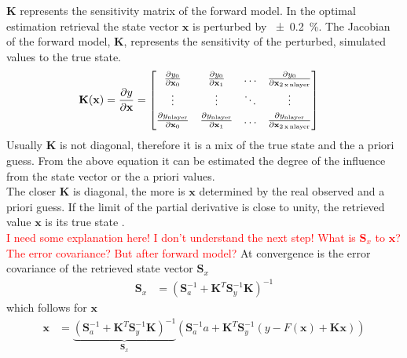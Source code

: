 $\mathbf{K}$ represents the sensitivity matrix of the forward model. In the optimal estimation retrieval the state vector $\mathbf{x}$ is perturbed by \SI{\pm 0.2}{\percent}. The Jacobian of the forward model, $\mathbf{K}$, represents the sensitivity of the perturbed, simulated values to the true state. 
\begin{align}
	\mathbf{K}(\mathbf{x}) & = \frac{\partial y}{\partial \mathbf{x}} =
    	\begin{bmatrix}
    		\frac{\partial y_0}{\partial \mathbf{x}_0} & 
            \frac{\partial y_0}{\partial \mathbf{x}_1}  & 
            \ldots & 
            \frac{\partial y_0}{\partial \mathbf{x}_{2\,\text{x\,nlayer}}} \\[0.3em]
            \vdots & \vdots & \ddots & \vdots \\[0.3em]
            \frac{\partial y_{\text{nlayer}}}{\partial \mathbf{x}_0} &
            \frac{\partial y_{\text{nlayer}}}{\partial \mathbf{x}_1} &
            \ldots &
            \frac{\partial y_{\text{nlayer}}}{\partial \mathbf{x}_{2\,\text{x\,nlayer}}}
    	\end{bmatrix} %
\end{align}
Usually $\mathbf{K}$ is not diagonal, therefore it is a mix of the true state and the a priori guess. From the above equation it can be estimated the degree of the influence from the state vector or the a priori values. \\
The closer $\mathbf{K}$ is diagonal, the more is $\mathbf{x}$ determined by the real observed and a priori guess. If the limit of the partial derivative is close to unity, the retrieved value $\mathbf{x}$ is its true state \citep{wood_estimation_2011}. \\
\textcolor{red}{I need some explanation here! I don't understand the next step! What is $\mathbf{S}_x$ to $\mathbf{x}$? The error covariance? But after forward model?} At convergence is the error covariance of the retrieved state vector $\mathbf{S}_x$
\begin{align}
	\mathbf{S}_x & = \left( \mathbf{S}_a^{-1} + \mathbf{K}^T \mathbf{S}_y^{-1} \mathbf{K} \right)^{-1}
\end{align}
which follows for $\mathbf{x}$
\begin{align}
	\mathbf{x} & = \underbrace{\left( \mathbf{S}_a^{-1} + \mathbf{K}^T \mathbf{S}_y^{-1} \mathbf{K} \right)^{-1} }_\text{$\mathbf{S}_x$} \left( \mathbf{S}_a^{-1} a + \mathbf{K}^T \mathbf{S}_y^{-1} \left(y - F(\mathbf{x}) + \mathbf{K} \mathbf{x} \right)  \right)
\end{align}
